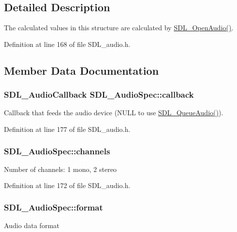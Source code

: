 \subsection{Detailed Description}
The calculated values in this structure are calculated by \hyperlink{_s_d_l__audio_8h_a2edf30e7747584e28041b4986f89f440}{S\-D\-L\-\_\-\-Open\-Audio()}. 

Definition at line 168 of file S\-D\-L\-\_\-audio.\-h.



\subsection{Member Data Documentation}
\hypertarget{struct_s_d_l___audio_spec_a1f8d05139f1679dcf359f49251233eac}{
\subsubsection[{callback}]{\setlength{\rightskip}{0pt plus 5cm}S\-D\-L\-\_\-\-Audio\-Callback S\-D\-L\-\_\-\-Audio\-Spec\-::callback}}\label{struct_s_d_l___audio_spec_a1f8d05139f1679dcf359f49251233eac}
Callback that feeds the audio device (N\-U\-L\-L to use \hyperlink{_s_d_l__audio_8h_a19ef6fa2396f581aaf4d9a9512972268}{S\-D\-L\-\_\-\-Queue\-Audio()}). 

Definition at line 177 of file S\-D\-L\-\_\-audio.\-h.

\hypertarget{struct_s_d_l___audio_spec_a31fe8b3710cf23bbef24be8a1749fe46}{
\subsubsection[{channels}]{ S\-D\-L\-\_\-\-Audio\-Spec\-::channels}}\label{struct_s_d_l___audio_spec_a31fe8b3710cf23bbef24be8a1749fe46}
Number of channels\-: 1 mono, 2 stereo 

Definition at line 172 of file S\-D\-L\-\_\-audio.\-h.

\hypertarget{struct_s_d_l___audio_spec_ae37c634cac5807762f184c8d5d49fc2d}{
\subsubsection[{format}]{ S\-D\-L\-\_\-\-Audio\-Spec\-::format}}\label{struct_s_d_l___audio_spec_ae37c634cac5807762f184c8d5d49fc2d}
Audio data format 

